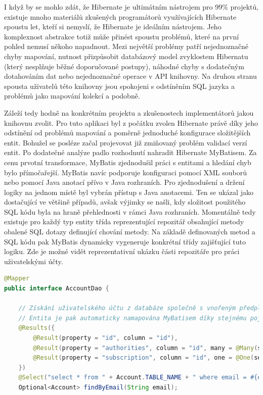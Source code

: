 \begin{itemize}
\begin{itemize}
		I když by se mohlo zdát, že Hibernate je ultimátním nástrojem pro 99\% projektů, existuje mnoho materiálů
		zkušených programátorů využívajících Hibernate spoustu let, kteří si nemyslí, že Hibernate je ideálním nástrojem.
		Jeho komplexnost abstrakce totiž může přinést spoustu problémů, které na první pohled nemusí někoho napadnout.
		Mezi největší problémy patří nejednoznačné chyby mapování, nutnost přizpůsobit databázový model zvyklostem Hibernatu
		(který nesplňuje běžné doporučované postupy), náhodné chyby s dodatečným dotahováním dat nebo nejednoznačné operace
		v \ac{API} knihovny.
		Na druhou stranu spousta uživatelů této knihovny jsou spokojeni s odstíněním \ac{SQL} jazyka a problémů jako
		mapování kolekcí a podobně. \cite{bad_hibernate}

		Záleží tedy hodně na konkrétním projektu a zkušenostech implementátorů jakou knihovnu zvolit.
		Pro tuto aplikaci byl z počátku zvolen Hibernate právě díky jeho odstínění od problémů mapování a poměrně
		jednoduché konfigurace složitějších entit.
		Bohužel se posléze začal projevovat již zmiňovaný problém validací verzí entit.
		Po dodatečné analýze padlo rozhodnutí nahradit Hibernate MyBatisem.
		Za cenu prvotní transformace, MyBatis zjednodušil práci s entitami a hledání chyb bylo přímočařejší.
		MyBatis navíc podporuje konfiguraci pomocí \ac{XML} souborů nebo pomocí Java anotací přívo v Java rozhraních.
		Pro zjednodušení a držení logiky na jednom místě byl vybrán přístup s Java anotacemi.
		Ten se ukázal jako dostačující ve většině případů, avšak výjimky se našli, kdy složitost použitého \ac{SQL} kódu
		byla na hraně přehlednosti v rámci Java rozhraních.
		Momentálně tedy existuje pro každý typ entity třída reprezentující repozitář obsahující metody obalené \ac{SQL}
		dotazy definující chování metody.
		Na základě definovaných metod a \ac{SQL} kódu pak MyBatis dynamicky vygeneruje konkrétní třídy zajišťující tuto
		logiku.
		Zde je možné vidět reprezentativní ukázku části repozitáře pro práci uživatelskými účty.
		\begin{lstlisting}[language=Java]
@Mapper
public interface AccountDao {

	// Získání uživatelského účtu z databáze společně s vnořeným předplatným a kolekcí rolí.
	// Entita je pak automaticky namapována MyBatisem díky stejnému pojmenování sloupců tabulek a atributů třídy.
	@Results({
		@Result(property = "id", column = "id"),
		@Result(property = "authorities", column = "id", many = @Many(select = "findAllRoles")),
		@Result(property = "subscription", column = "id", one = @One(select = "findSubscriptionByAccountId"))
	})
	@Select("select * from " + Account.TABLE_NAME + " where email = #{email}")
	Optional<Account> findByEmail(String email);


\end{lstlisting}
\end{itemize}
\end{itemize}

